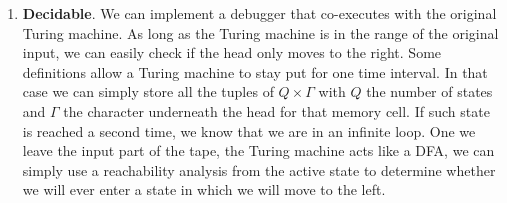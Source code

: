 \documentclass{article}
\begin{document}
\begin{exercise}
\begin{answer}
\begin{enumerate}
 \item \textbf{Decidable}. We can implement a debugger that co-executes with the original Turing machine. As long as the Turing machine is in the range of the original input, we can easily check if the head only moves to the right. Some definitions allow a Turing machine to stay put for one time interval. In that case we can simply store all the tuples of $Q\times\Gamma$ with $Q$ the number of states and $\Gamma$ the character underneath the head for that memory cell. If such state is reached a second time, we know that we are in an infinite loop. One we leave the input part of the tape, the Turing machine acts like a DFA, we can simply use a reachability analysis from the active state to determine whether we will ever enter a state in which we will move to the left.
\end{enumerate}
\end{answer}
\end{exercise}
\end{document}
